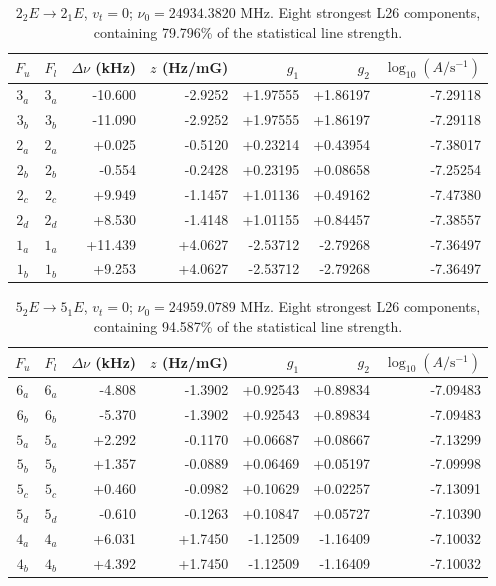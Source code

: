 \begin{table}[!htbp]
\centering\small\renewcommand{\arraystretch}{1.1}\setlength{\tabcolsep}{5pt}
\caption{$2_{2} E\rightarrow 2_{1} E$, $v_t=0$; $\nu_0=24934.3820$ MHz. Eight strongest L26 components, containing 79.796\% of the statistical line strength.}
\label{tab:sm-zeeman-24p934}
\begin{tabular}{ccrrrrr}
\hline\hline
$F_u$ & $F_l$ & $\Delta\nu$ (kHz) & $z$ (Hz/mG) & $g_1$ & $g_2$ & $\log_{10}(A/\mathrm{s}^{-1})$ \\
\hline
$3_{a}$ & $3_{a}$ & -10.600 & -2.9252 & +1.97555 & +1.86197 & -7.29118\\
$3_{b}$ & $3_{b}$ & -11.090 & -2.9252 & +1.97555 & +1.86197 & -7.29118\\
$2_{a}$ & $2_{a}$ & +0.025 & -0.5120 & +0.23214 & +0.43954 & -7.38017\\
$2_{b}$ & $2_{b}$ & -0.554 & -0.2428 & +0.23195 & +0.08658 & -7.25254\\
$2_{c}$ & $2_{c}$ & +9.949 & -1.1457 & +1.01136 & +0.49162 & -7.47380\\
$2_{d}$ & $2_{d}$ & +8.530 & -1.4148 & +1.01155 & +0.84457 & -7.38557\\
$1_{a}$ & $1_{a}$ & +11.439 & +4.0627 & -2.53712 & -2.79268 & -7.36497\\
$1_{b}$ & $1_{b}$ & +9.253 & +4.0627 & -2.53712 & -2.79268 & -7.36497\\
\hline\end{tabular}
\end{table}

\begin{table}[!htbp]
\centering\small\renewcommand{\arraystretch}{1.1}\setlength{\tabcolsep}{5pt}
\caption{$5_{2} E\rightarrow 5_{1} E$, $v_t=0$; $\nu_0=24959.0789$ MHz. Eight strongest L26 components, containing 94.587\% of the statistical line strength.}
\label{tab:sm-zeeman-24p959}
\begin{tabular}{ccrrrrr}
\hline\hline
$F_u$ & $F_l$ & $\Delta\nu$ (kHz) & $z$ (Hz/mG) & $g_1$ & $g_2$ & $\log_{10}(A/\mathrm{s}^{-1})$ \\
\hline
$6_{a}$ & $6_{a}$ & -4.808 & -1.3902 & +0.92543 & +0.89834 & -7.09483\\
$6_{b}$ & $6_{b}$ & -5.370 & -1.3902 & +0.92543 & +0.89834 & -7.09483\\
$5_{a}$ & $5_{a}$ & +2.292 & -0.1170 & +0.06687 & +0.08667 & -7.13299\\
$5_{b}$ & $5_{b}$ & +1.357 & -0.0889 & +0.06469 & +0.05197 & -7.09998\\
$5_{c}$ & $5_{c}$ & +0.460 & -0.0982 & +0.10629 & +0.02257 & -7.13091\\
$5_{d}$ & $5_{d}$ & -0.610 & -0.1263 & +0.10847 & +0.05727 & -7.10390\\
$4_{a}$ & $4_{a}$ & +6.031 & +1.7450 & -1.12509 & -1.16409 & -7.10032\\
$4_{b}$ & $4_{b}$ & +4.392 & +1.7450 & -1.12509 & -1.16409 & -7.10032\\
\hline\end{tabular}
\end{table}

